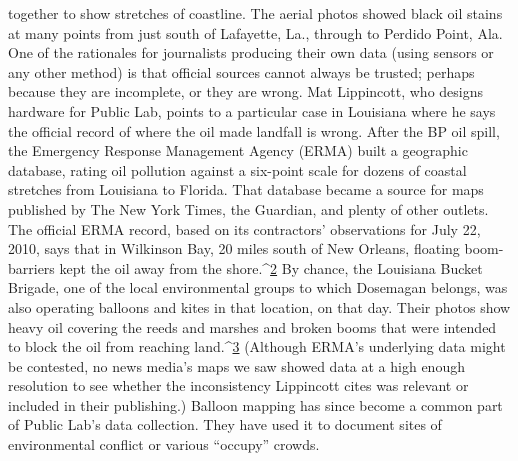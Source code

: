 together to show stretches of coastline. The aerial photos showed black oil
stains at many points from just south of Lafayette, La., through to Perdido
Point, Ala.
One of the rationales for journalists producing their own data (using sensors
or any other method) is that official sources cannot always be trusted;
perhaps because they are incomplete, or they are wrong. Mat Lippincott,
who designs hardware for Public Lab, points to a particular case in Louisiana
where he says the official record of where the oil made landfall is wrong.
After the BP oil spill, the Emergency Response Management Agency
(ERMA) built a geographic database, rating oil pollution against a six-point
scale for dozens of coastal stretches from Louisiana to Florida. That database
became a source for maps published by The New York Times, the
Guardian, and plenty of other outlets. The official ERMA record, based on
its contractors' observations for July 22, 2010, says that in Wilkinson Bay, 20
miles south of New Orleans, floating boom-barriers kept the oil away from
the shore.^{\href{#endnotes-public-lab}{2}} By chance, the Louisiana Bucket Brigade, one of the local environmental
groups to which Dosemagan belongs, was also operating balloons
and kites in that location, on that day. Their photos show heavy oil
covering the reeds and marshes and broken booms that were intended to
block the oil from reaching land.^{\href{#endnotes-public-lab}{3}} (Although ERMA's underlying data might
be contested, no news media's maps we saw showed data at a high enough
resolution to see whether the inconsistency Lippincott cites was relevant or
included in their publishing.)
Balloon mapping has since become a common part of Public Lab's data collection.
They have used it to document sites of environmental conflict or
various ``occupy'' crowds.

